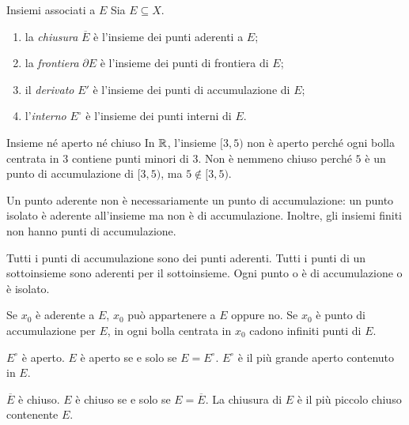 \documentclass[a4paper]{article}
\begin{document}
\begin{snippetdefinition}{Insiemi associati a \(E\)}
    Sia \(E\subseteq X\).
    \begin{enumerate}
        \item la \emph{chiusura} \(\overline E\) è l'insieme dei punti aderenti a \(E\);
        \item la \emph{frontiera} \(\partial E\) è l'insieme dei punti di frontiera di \(E\);
        \item il \emph{derivato} \(E'\) è l'insieme dei punti di accumulazione di \(E\);
        \item l'\emph{interno} \(E^\circ\) è l'insieme dei punti interni di \(E\).
    \end{enumerate}
\end{snippetdefinition}

\begin{snippetexample}{Insieme né aperto né chiuso}
    In \(\mathbb{R}\), l'insieme \([3,5)\) non è aperto perché ogni bolla centrata in \(3\)
    contiene punti minori di \(3\). Non è nemmeno chiuso perché \(5\) è un punto di accumulazione
    di \([3,5)\), ma \(5\notin[3,5)\).
\end{snippetexample}

Un punto aderente non è necessariamente un punto di accumulazione: un punto isolato è aderente
all'insieme ma non è di accumulazione. Inoltre, gli insiemi finiti non hanno punti di accumulazione.

Tutti i punti di accumulazione sono dei punti aderenti.
Tutti i punti di un sottoinsieme sono aderenti per il sottoinsieme.
Ogni punto o è di accumulazione o è isolato.

Se \(x_0\) è aderente a \(E\), \(x_0\) può appartenere a \(E\) oppure no.
Se \(x_0\) è punto di accumulazione per \(E\), in ogni bolla centrata in \(x_0\) cadono infiniti punti di \(E\).

\begin{snippetproposition}{}
    \(E^\circ\) è aperto. \(E\) è aperto se e solo se \(E = E^\circ\).
    \(E^\circ\) è il più grande aperto contenuto in \(E\).
    
    \(\overline{E}\) è chiuso. \(E\) è chiuso se e solo se \(E = \overline{E}\).
    La chiusura di \(E\) è il più piccolo chiuso contenente \(E\).
\end{snippetproposition}
\end{document}
